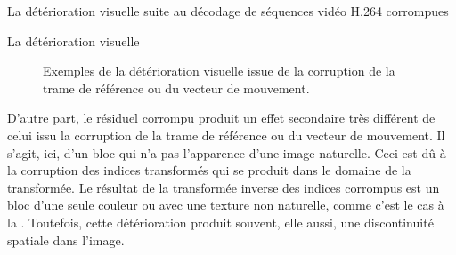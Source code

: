 \begin{chapter}{La détérioration visuelle suite au décodage de séquences vidéo H.264 corrompues}
\begin{section}{La détérioration visuelle}
\begin{figure}
	\caption[Détérioration visuelle issue de la corruption de la trame de référence
ou du vecteur de mouvement]{Exemples de la détérioration visuelle issue de la
corruption de la trame de référence ou du vecteur de mouvement.}
	\label{fig-VectorsBad}
\end{figure}

D'autre part, le résiduel corrompu produit un effet secondaire très différent de
celui issu la corruption de la trame de référence ou du vecteur de mouvement. Il
s'agit, ici, d'un bloc qui n'a pas l'apparence d'une image naturelle. Ceci est
dû à la corruption des indices transformés qui se produit dans le domaine de la
transformée. Le résultat de la transformée inverse des indices corrompus est un
bloc d'une seule couleur ou avec une texture non naturelle, comme c'est le cas à
la . Toutefois, cette détérioration produit souvent, elle aussi,
une discontinuité spatiale dans l'image.


\end{section}
\end{chapter}
